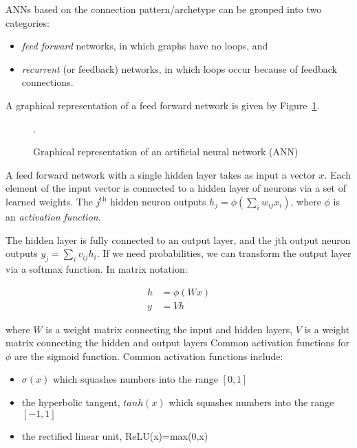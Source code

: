 ANNs based on the connection pattern/archetype can be grouped into two
categories:

\begin{itemize}
    \item \textit{feed forward} networks, in which graphs have no loops, and
    \item \textit{recurrent} (or feedback) networks, in which loops occur
    because of feedback connections.
\end{itemize}


A graphical representation of a feed forward network is given by Figure~\ref{fig:ann}.

\begin{figure}[!htbp]
    \centering
    
    \caption{Graphical representation of an artificial neural network (ANN)}.\label{fig:ann}
\end{figure}

A feed forward network with a single hidden layer takes as input a vector \(x\).
Each element of the input vector is connected to a hidden layer of neurons via a
set of learned weights. The \(j^{\text{th}}\) hidden neuron outputs \(h_j = \phi
(\sum_{i} w_{ij} x_{i})\), where \(\phi\) is an \textit{activation function}.

The hidden layer is fully connected to an output layer, and the jth output
neuron outputs \(y_{j} = \sum_{i} v_{ij} h_{i}\). If we need probabilities, we
can transform the output layer via a softmax function. In matrix notation:

\begin{align*}
h & = \phi(Wx) \\
y & = Vh
\end{align*}

where \(W\) is a weight matrix connecting the input and
hidden layers, \(V\) is  a weight matrix connecting the hidden and output layers
Common activation functions for \(\phi\) are the sigmoid function.
Common activation functions include:

\begin{itemize}
    \item \(\sigma(x)\) which squashes numbers into the range \([0, 1]\)
    \item the hyperbolic tangent, \(tanh(x)\) which squashes numbers into the range \([-1, 1]\)
    \item the rectified linear unit, ReLU(x)=max(0,x)
\end{itemize}

